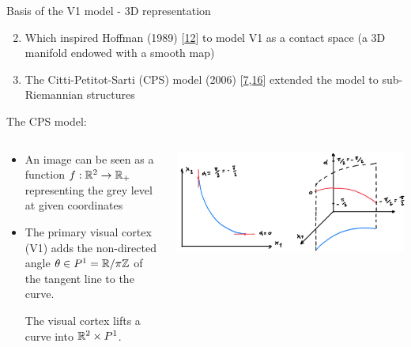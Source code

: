 \documentclass[10pt,american,ignorenonframetext,aspectratio=1610]{beamer}
\providecommand{\tightlist}{%
  \setlength{\itemsep}{0pt}\setlength{\parskip}{0pt}}
\theoremstyle{remark}
\begin{document}
\begin{frame}{Basis of the V1 model - 3D representation}
\protect\hypertarget{basis-of-the-v1-model---3d-representation}{}

\begin{enumerate}
\setcounter{enumi}{1}
\tightlist
\item
  Which inspired Hoffman (1989)
  {[}\protect\hyperlink{ref-hoffman1989}{12}{]} to model V1 as a contact
  space (a 3D manifold endowed with a smooth map)
\item
  The Citti-Petitot-Sarti (CPS) model (2006)
  {[}\protect\hyperlink{ref-citti2006}{7},\protect\hyperlink{ref-petitot1999}{16}{]}
  extended the model to sub-Riemannian structures
\end{enumerate}

The CPS model:

\begin{columns}[T]
\begin{column}{0.5\textwidth}
\begin{itemize}
\item
  An image can be seen as a function \(f:\mathbb{R}^2\rightarrow\mathbb{R}_+\)
  representing the grey level at given coordinates
\item
  The primary visual cortex (V1) adds the non-directed angle
  \(\theta\in P^1=\mathbb{R}/\pi\mathbb{Z}\) of the tangent line to the curve.

  The visual cortex lifts a curve into \(\mathbb{R}^2\times P^1\).
\end{itemize}
\end{column}

\begin{column}{0.5\textwidth}
\includegraphics{img/v1_model_1.jpg}
\end{column}
\end{columns}

\end{frame}
\end{document}
